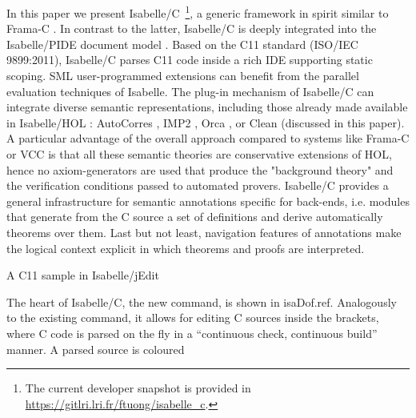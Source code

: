 \begin{isabellebody}
\begin{isamarkuptext*}
In this paper we present Isabelle/C~\footnote{The current developer snapshot is provided in
  \url{https://gitlri.lri.fr/ftuong/isabelle_c}.}, a generic framework in
spirit similar to Frama-C \cite{frama-c-home-page}. In contrast to the latter, Isabelle/C is
deeply integrated into the Isabelle/PIDE document model \cite{DBLP:conf/itp/Wenzel14}. Based on
the C11 standard (ISO/IEC 9899:2011), Isabelle/C parses C11 code inside a rich IDE supporting static
scoping. SML user-programmed extensions can benefit from the parallel evaluation techniques of
Isabelle. The plug-in mechanism of Isabelle/C can integrate diverse semantic representations,
including those already made available in Isabelle/HOL \cite{DBLP:books/sp/NipkowPW02}: AutoCorres
\cite{DBLP:conf/pldi/GreenawayLAK14}, IMP2 \cite{DBLP:journals/afp/LammichW19},
Orca \cite{bockenek:hal-02069705}, or Clean (discussed in this paper). A particular advantage of
the overall approach compared to systems like Frama-C or VCC is that all these semantic
theories are conservative extensions of HOL, hence no axiom-generators are used that produce the
"background theory" and the verification conditions passed to automated provers. Isabelle/C provides
a general infrastructure for semantic annotations specific for back-ends, i.e. modules that generate
from the C source a set of definitions and derive automatically theorems over them.
Last but not least, navigation features of annotations make the logical context explicit in which 
theorems and proofs are interpreted.%
\end{isamarkuptext*}\isamarkuptrue%
%
\begin{isamarkupfigure*}%
[label = {C-sample},type = {Isa_COL.figure}, args={label = {C-sample},type = {Isa_COL.figure}, Isa_COL.figure.relative_width = {60}, Isa_COL.figure.src = {figures/A-C-Source}, Isa_COL.figure.spawn_columns = {True}}]A C11 sample in Isabelle/jEdit%
\end{isamarkupfigure*}\isamarkuptrue%
%
\begin{isamarkuptext}%
The heart of Isabelle/C, the new  command, is shown in \csname isaDof.ref. 
Analogously to the existing  command, it allows for editing C
sources inside the \isa{{\isacartoucheopen}\ {\isachardot}{\isachardot}\ {\isacartoucheclose}} brackets, where C code is
parsed on the fly in a ``continuous check, continuous build'' manner. A parsed source is coloured

\end{isamarkuptext}
\end{isabellebody}
